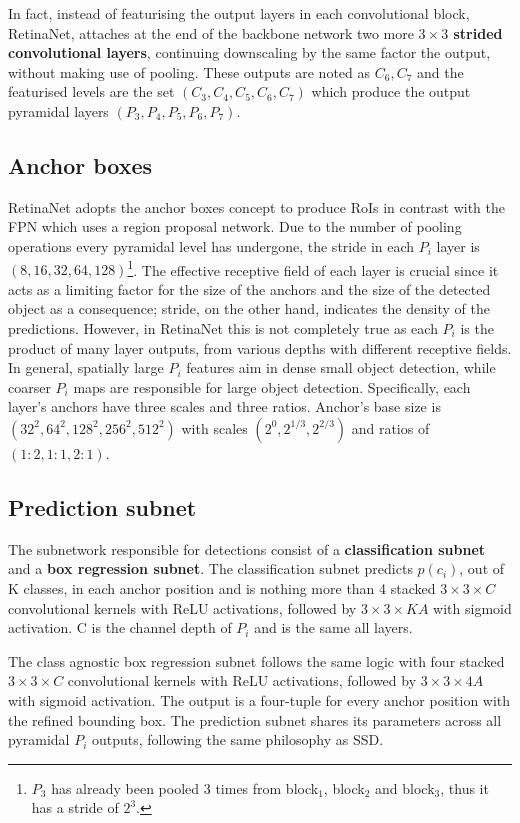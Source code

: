 In fact, instead of featurising the output layers in each convolutional block, RetinaNet, attaches at the end of the backbone network two more \textbf{$3\times3$ strided convolutional layers}, continuing downscaling by the same factor the output, without making use of pooling. These outputs are noted as $C_6,C_7$ and the featurised levels are the set $(C_3, C_4, C_5, C_6, C_7)$ which produce the output pyramidal layers $(P_3, P_4, P_5, P_6, P_7)$.

\subsection{Anchor boxes}
RetinaNet adopts the anchor boxes concept to produce RoIs in contrast with the FPN which uses a region proposal network. Due to the number of pooling operations every pyramidal level has undergone, the stride in each $P_i$ layer is $(8, 16, 32, 64, 128)$\footnote{$P_3$ has already been pooled 3 times from block$_1$, block$_2$ and block$_3$, thus it has a stride of $2^3$.}. The effective receptive field of each layer is crucial since it acts as a limiting factor for the size of the anchors and the size of the detected object as a consequence; stride, on the other hand, indicates the density of the predictions. However, in RetinaNet this is not completely true as each $P_i$ is the product of many layer outputs, from various depths with different receptive fields. In general, spatially large $P_i$ features aim in dense small object detection, while coarser $P_i$ maps are responsible for large object detection. Specifically, each layer's anchors have three scales and three ratios. Anchor's base size is $(32^2, 64^2, 128^2, 256^2, 512^2)$ with scales $(2^0, 2^{1/3}, 2^{2/3})$ and ratios of $(1\!:\!2,1\!:\!1,2\!:\!1)$.

\subsection{Prediction subnet}
The subnetwork responsible for detections consist of a \textbf{classification subnet} and a \textbf{box regression subnet}. The classification subnet predicts $p(c_i)$, out of K classes, in each anchor position and is nothing more than 4 stacked $3\times3\times C$ convolutional kernels with ReLU activations, followed by  $3\times3\times KA$ with sigmoid activation. C is the channel depth of $P_i$ and is the same all layers.

The class agnostic box regression subnet follows the same logic with four stacked $3\times3\times C$ convolutional kernels with ReLU activations, followed by $3\times3\times 4A$ with sigmoid activation. The output is a four-tuple for every anchor position with the refined bounding box. The prediction subnet shares its parameters across all pyramidal $P_i$ outputs, following the same philosophy as SSD.

